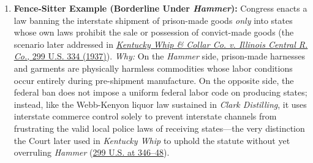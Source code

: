 \documentclass[12pt]{article}
\begin{document}
\begin{enumerate}
\item \textbf{Fence-Sitter Example (Borderline Under \textit{Hammer}):} Congress enacts a law banning the interstate shipment of prison-made goods \textit{only} into states whose own laws prohibit the sale or possession of convict-made goods (the scenario later addressed in \href{https://supreme.justia.com/cases/federal/us/299/334/}{\textit{Kentucky Whip \& Collar Co. v. Illinois Central R. Co.}, 299 U.S. 334 (1937)}). \textit{Why:} On the \textit{Hammer} side, prison-made harnesses and garments are physically harmless commodities whose labor conditions occur entirely during pre-shipment manufacture. On the opposite side, the federal ban does not impose a uniform federal labor code on producing states; instead, like the Webb-Kenyon liquor law sustained in \textit{Clark Distilling}, it uses interstate commerce control solely to prevent interstate channels from frustrating the valid local police laws of receiving states---the very distinction the Court later used in \textit{Kentucky Whip} to uphold the statute without yet overruling \textit{Hammer} (\href{https://supreme.justia.com/cases/federal/us/299/334/}{299 U.S. at 346--48}).
\end{enumerate}
\end{document}
